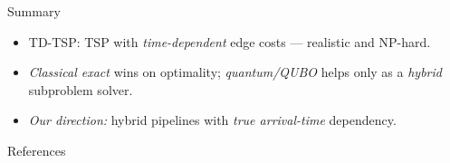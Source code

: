 \documentclass[
11pt,notheorems,hyperref={pdfauthor=Alma Arevalo Loyola}
]{beamer}
\renewcommand{\emphasize}[1]{\textcolor{emphasisblue}{\textit{#1}}}
\newcommand{\emphteal}[1]{\textcolor{emphasisteal}{\textit{#1}}}
\begin{document}
\begin{frame}{Summary}
  \begin{itemize}
    \item TD-TSP: TSP with \emphteal{time-dependent} edge costs --- realistic and NP-hard.
    \item \emphasize{Classical exact} wins on optimality; \emphasize{quantum/QUBO} helps only as a \emphasize{hybrid} subproblem solver.
    \item \emphasize{Our direction:} hybrid pipelines with \emphasize{true arrival-time} dependency.
  \end{itemize}
\end{frame}

\begin{frame}[allowframebreaks]{References}
  \printbibliography
\end{frame}
\end{document}
